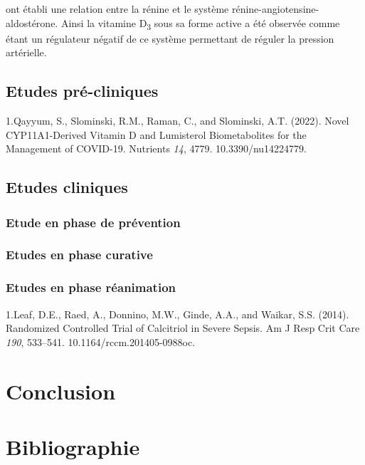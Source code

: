 \documentclass[
  a4paper,
  DIV=11,
  numbers=noendperiod,
  listof=totoc]{scrreprt}
\begin{document}
\textcite{Li.2002} ont établi une relation entre la rénine et le système
rénine-angiotensine-aldostérone. Ainsi la vitamine D\textsubscript{3}
sous sa forme active a été observée comme étant un régulateur négatif de
ce système permettant de réguler la pression artérielle.

\hypertarget{etudes-pruxe9-cliniques}{%
\section{Etudes pré-cliniques}\label{etudes-pruxe9-cliniques}}

1.Qayyum, S., Slominski, R.M., Raman, C., and Slominski, A.T. (2022).
Novel CYP11A1-Derived Vitamin D and Lumisterol Biometabolites for the
Management of COVID-19. Nutrients \emph{14}, 4779. 10.3390/nu14224779.

\hypertarget{etudes-cliniques}{%
\section{Etudes cliniques}\label{etudes-cliniques}}

\hypertarget{etude-en-phase-de-pruxe9vention}{%
\subsection{Etude en phase de
prévention}\label{etude-en-phase-de-pruxe9vention}}

\hypertarget{etudes-en-phase-curative}{%
\subsection{Etudes en phase curative}\label{etudes-en-phase-curative}}

\hypertarget{etudes-en-phase-ruxe9animation}{%
\subsection{Etudes en phase
réanimation}\label{etudes-en-phase-ruxe9animation}}

1.Leaf, D.E., Raed, A., Donnino, M.W., Ginde, A.A., and Waikar, S.S.
(2014). Randomized Controlled Trial of Calcitriol in Severe Sepsis. Am J
Resp Crit Care \emph{190}, 533--541. 10.1164/rccm.201405-0988oc.

\newpage{}

\hypertarget{conclusion}{%
\chapter{Conclusion}\label{conclusion}}

\newpage{}

\hypertarget{bibliographie}{%
\chapter{Bibliographie}\label{bibliographie}}

\printbibliography[heading=none]
\end{document}
